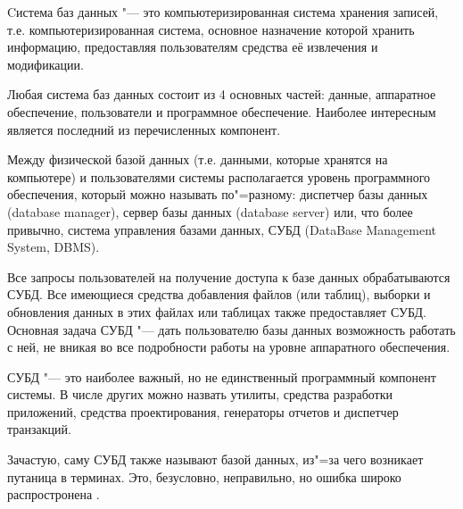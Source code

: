 Cистема баз данных "--- это компьютеризированная система
хранения записей, т.е. компьютеризированная система, основное назначение
которой хранить информацию, предоставляя пользователям средства её извлечения
и модификации.

Любая система баз данных состоит из 4 основных частей: данные, аппаратное обеспечение,
пользователи и программное обеспечение. Наиболее интересным является последний из перечисленных компонент. 

Между физической базой данных (т.е. данными, которые хранятся на компьютере) 
и пользователями системы располагается уровень программного
обеспечения, который можно называть по"=разному: диспетчер базы данных (database
manager), сервер базы данных (database server) или, что более привычно, система
управления базами данных, СУБД (DataBase Management System, DBMS). 

Все запросы пользователей на получение доступа к базе данных обрабатываются СУБД. 
Все имеющиеся средства добавления файлов (или таблиц), выборки и обновления данных в
этих файлах или таблицах также предоставляет СУБД. Основная задача СУБД "--- дать
пользователю базы данных возможность работать с ней, не вникая во все
подробности работы на уровне аппаратного обеспечения.

СУБД "--- это наиболее важный, но не единственный программный компонент системы. В
числе других можно назвать утилиты, средства разработки приложений,
средства проектирования, генераторы отчетов и диспетчер транзакций. 

Зачастую, саму СУБД также называют базой данных, из"=за чего возникает путаница в терминах. Это, безусловно,
неправильно, но ошибка широко распростронена \cite{date}.